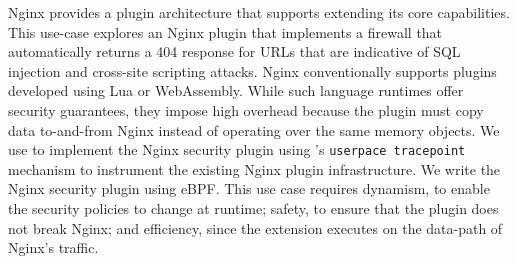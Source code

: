 Nginx provides a plugin architecture that supports extending its core capabilities.  This use-case explores an Nginx plugin that implements a firewall that automatically returns a 404 response for URLs that are indicative of SQL injection and cross-site scripting attacks.  Nginx conventionally supports plugins developed using Lua or WebAssembly.  While such language runtimes offer security guarantees, they impose high overhead because the plugin must copy data to-and-from Nginx instead of operating over the same memory objects.  We use \sys to implement the Nginx security plugin using \sys's \texttt{userpace tracepoint} mechanism to instrument the existing Nginx plugin infrastructure.  We write the Nginx security plugin using eBPF.  This use case requires dynamism, to enable the security policies to change at runtime; safety, to ensure that the plugin does not break Nginx; and efficiency, since the extension executes on the data-path of Nginx's traffic.






